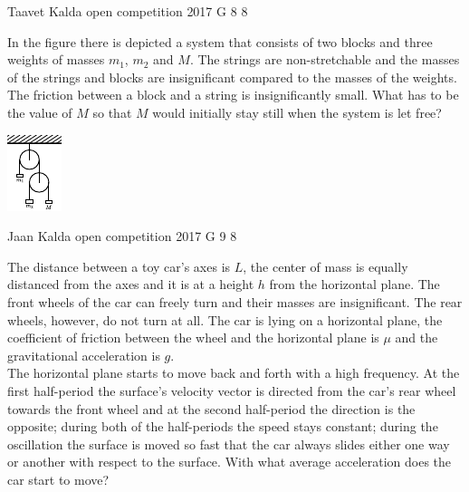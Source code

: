 \documentclass[11pt]{article}
\begin{document}
{Taavet Kalda} %
{open competition} %
{2017} %
{G 8} %
{8} %
{

\ifEngStatement
In the figure there is depicted a system that consists of two blocks and three weights of masses $m_1$, $m_2$ and $M$. The strings are non-stretchable and the masses of the strings and blocks are insignificant compared to the masses of the weights. The friction between a block and a string is insignificantly small. What has to be the value of $M$ so that $M$ would initially stay still when the system is let free?
\begin{center}
	\includegraphics[width = 0.3\linewidth]  {2017-lahg-08-double_pulleys_img.pdf}
\end{center}
\fi
}

{Jaan Kalda} %
{open competition} %
{2017} %
{G 9} %
{8} %
{

\ifEngStatement
The distance between a toy car’s axes is $L$, the center of mass is equally distanced from the axes and it is at a height $h$ from the horizontal plane. The front wheels of the car can freely turn and their masses are insignificant. The rear wheels, however, do not turn at all. The car is lying on a horizontal plane, the coefficient of friction between the wheel and the horizontal plane is $\mu$ and the gravitational acceleration is $g$.\\
The horizontal plane starts to move back and forth with a high frequency. At the first half-period the surface’s velocity vector is directed from the car’s rear wheel towards the front wheel and at the second half-period the direction is the opposite; during both of the half-periods the speed stays constant; during the oscillation the surface is moved so fast that the car always slides either one way or another with respect to the surface. With what average acceleration does the car start to move?
\fi
}
\end{document}
